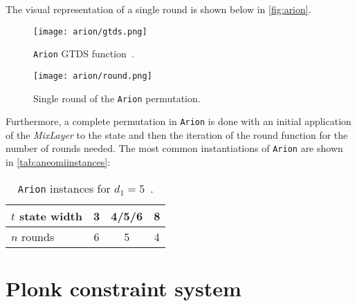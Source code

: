 \documentclass[12pt, a4paper]{report}
\begin{document}
The visual representation of a single round is shown below in \autoref{fig:arion}.

\begin{figure}[H]
  \begin{center}
    \texttt{[image: arion/gtds.png]}
  \end{center}
  \caption{\texttt{Arion} GTDS function~\cite[Fig.~1.21]{bouvier}.}\label{fig:gtds}
\end{figure}

\begin{figure}[H]
  \begin{center}
    \texttt{[image: arion/round.png]}
  \end{center}
  \caption{Single round of the \texttt{Arion} permutation.}\label{fig:arion}
\end{figure}

Furthermore, a complete permutation in \texttt{Arion} is done with an initial application of the \textit{MixLayer} to the state and then the iteration of the round function for the number of rounds needed.
The most common instantiations of \texttt{Arion} are shown in \autoref{tab:aneomiinstances}:
\begin{table}[H]
  \caption{\texttt{Arion} instances for $d_1 = 5$~\cite[Tab.~3]{arion}.}\label{tab:aneomiinstances}
  \begin{center}
    \begin{tabular}{|l|c|c|c|}
      \hline
      $t$ state width & 3 & 4/5/6 & 8 \\
      \hline
      $n$ rounds & 6 & 5 & 4 \\
      \hline
    \end{tabular}
  \end{center}
\end{table}

\section{\textsf{Plonk} constraint system}\label{sec:plonk}
\end{document}
